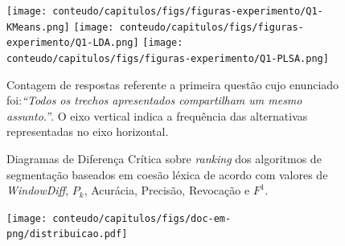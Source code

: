 \begin{figure}[!h] \centering     %
		\texttt{[image: conteudo/capitulos/figs/figuras-experimento/Q1-KMeans.png]}
		\texttt{[image: conteudo/capitulos/figs/figuras-experimento/Q1-LDA.png]}
		\texttt{[image: conteudo/capitulos/figs/figuras-experimento/Q1-PLSA.png]}
	\caption{Contagem de respostas referente a primeira questão cujo enunciado foi:\textit{``Todos os trechos apresentados compartilham um mesmo assunto.''}. O eixo vertical indica a frequência das alternativas representadas no eixo horizontal. }
	\label{fig:Q1}
\end{figure}












\begin{figure}[!h]
	\centering     %


		\caption{Diagramas de Diferença Crítica sobre \textit{ranking} dos algoritmos de segmentação baseados em coesão léxica de acordo com valores de \textit{WindowDiff}, $P_k$, Acurácia, Precisão, Revocação e $F^1$.}
	\label{fig:CDs}
\end{figure}







  \begin{center}
	\begin{figure}[h!]

		\texttt{[image: conteudo/capitulos/figs/doc-em-png/distribuicao.pdf]}

	\end{figure}
\end{center}


\label{fig:distribuicao-ata}

